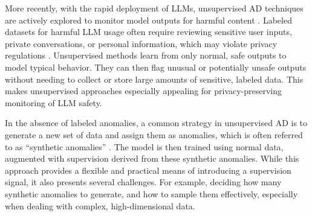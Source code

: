 \documentclass{article}
\begin{document}
More recently, with the rapid deployment of LLMs, unsupervised AD techniques are actively explored to monitor model outputs for harmful content \citep{zhu2024llms, zhang2024logicode}. Labeled datasets for harmful LLM usage often require reviewing sensitive user inputs, private conversations, or personal information, which may violate privacy regulations \citep{abadi2016deep, shokri2017membership}. Unsupervised methods learn from only normal, safe outputs to model typical behavior. They can then flag unusual or potentially unsafe outputs without needing to collect or store large amounts of sensitive, labeled data. This makes unsupervised approaches especially appealing for privacy-preserving monitoring of LLM safety. 

In the absence of labeled anomalies, a common strategy in unsupervised AD is to generate a
new set of data and assign them as anomalies, which is often referred to as “synthetic anomalies” \citep{sipple20NSNN, mayer2020privacy, schluter2022natural}. The model is then trained using normal data, augmented with supervision derived from these synthetic anomalies.
While this approach provides a flexible and practical means of introducing a supervision signal, it also presents several challenges. For example, deciding how many synthetic anomalies to generate, and how to sample them effectively, especially when dealing with complex, high-dimensional data.




 
\end{document}
